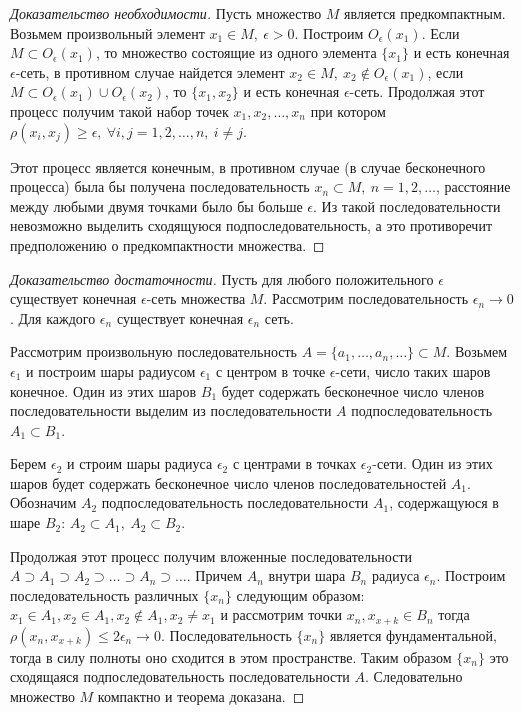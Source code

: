 \documentclass[14pt,a4paper]{extarticle}
\theoremstyle{definition}
\theoremstyle{remark}
\renewcommand{\[}{\begin{dmath*}[compact]}
\renewcommand{\]}{\end{dmath*}}
\newcommand{\sep}{ , \ \allowbreak }
\begin{document}
\begin{proof}[Доказательство необходимости]
  Пусть множество $M$ является предкомпактным.
  Возьмем произвольный элемент $x_1 \in M\sep \epsilon > 0$.
  Построим $O_{\epsilon}(x_1)$.
  Если $M \subset O_{\epsilon}(x_1)$,
  то множество состоящие из одного элемента $\{x_1\}$ и есть
  конечная $\epsilon$-сеть, в противном случае найдется элемент
  $x_2 \in M\sep x_2 \not\in O_\epsilon(x_1)$,
  если $M\subset O_\epsilon(x_1)\cup O_\epsilon(x_2)$,
  то $\{x_1,x_2\}$ и есть конечная $\epsilon$-сеть.
  Продолжая этот процесс получим такой набор точек $x_1, x_2,\dots,x_n$
  при котором $\rho(x_i,x_j)\geq \epsilon\sep \forall i,j=1,2,\dots,n \sep
  i \neq j$.

  Этот процесс является конечным, в противном случае
  (в случае бесконечного процесса) была бы получена последовательность
  ${x_n}\subset M\sep n=1,2,\dots$, расстояние между любыми двумя точками
  было бы больше $\epsilon$.
  Из такой последовательности невозможно выделить сходящуюся
  подпоследовательность,
  а это противоречит предположению о предкомпактности множества.
\end{proof}

\begin{proof}[Доказательство достаточности]
  Пусть для любого положительного $\epsilon$ существует конечная
  $\epsilon$-сеть множества $M$.
  Рассмотрим последовательность $\epsilon_n \to 0$.
  Для каждого $\epsilon_n$ существует конечная $\epsilon_n$ сеть.

  Рассмотрим произвольную последовательность
   $A=\{a_{1},\dots,a_n,\dots\}\subset M$.
  Возьмем $\epsilon_1$ и построим шары радиусом $\epsilon_1$
  с центром в точке $\epsilon$-сети, число таких шаров конечное.
  Один из этих шаров $B_1$ будет содержать бесконечное число членов
  последовательности выделим из последовательности $A$ подпоследовательность
  $A_1\subset B_1$.

  Берем $\epsilon_2$ и строим шары радиуса $\epsilon_2$ с центрами в точках
  $\epsilon_2$-сети.
  Один из этих шаров будет содержать бесконечное число членов
  последовательностей $A_1$. Обозначим $A_2$ подпоследовательность
  последовательности $A_1$, содержащуюся в шаре $B_2$:
  $A_2\subset A_1\sep A_2\subset B_2$.

  Продолжая этот процесс получим вложенные последовательности
  $A\supset A_1\supset A_2\supset \dots\supset A_n\supset \dots$.
  Причем $A_n$ внутри шара $B_n$ радиуса $\epsilon_n$.
  Построим последовательность различных $\{x_n\}$ следующим образом:
  $x_1 \in A_1, x_2 \in A_1, x_2 \not\in A_1, x_2 \neq x_1$ и рассмотрим точки
  $x_n, x_{x+k} \in B_n$ тогда $\rho(x_n,x_{x+k})\leq 2 \epsilon_n \to 0$.
  Последовательность $\{x_n\}$ является фундаментальной, тогда в силу полноты
  оно сходится в этом пространстве.
  Таким образом $\{x_n\}$ это сходящаяся подпоследовательность
  последовательности $A$.
  Следовательно множество $M$ компактно и теорема доказана.
\end{proof}
\end{document}
